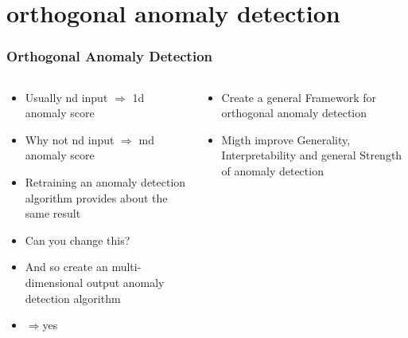 \documentclass[hyperref={pdfpagelabels=false}]{beamer}
\begin{document}
\newpage
\section{orthogonal anomaly detection}\label{sec:orthogonal anomaly detection}



\begin{frame}[label=Orthogonal Anomaly Detection]
\frametitle{Orthogonal Anomaly Detection}
\begin{columns}[c] %
\begin{column}{0.48\textwidth}%
\begin{itemize}

    \item Usually nd input $\Rightarrow$ 1d anomaly score

    \item Why not nd input $\Rightarrow$ md anomaly score

    \item Retraining an anomaly detection algorithm provides about the same result

    \item Can you change this?

    \item And so create an multi-dimensional output anomaly detection algorithm

    \item $\Rightarrow$yes


\end{itemize}
\end{column}%
\hfill%
\begin{column}{0.48\textwidth}%
\begin{itemize}

    \item Create a general Framework for orthogonal anomaly detection

    \item Migth improve Generality, Interpretability and general Strength of anomaly detection


\end{itemize}
\end{column}%
\hfill%
\end{columns}

\end{frame}
\end{document}
